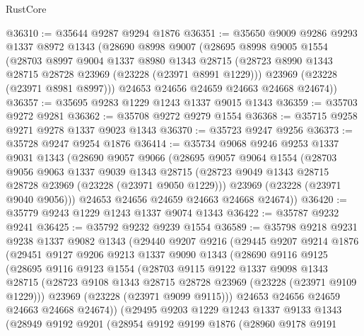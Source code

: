 \begin{lexlean}{RustCore}
\begin{coremodule}
@36310 := @35644 @9287 @9294 @1876
@36351 := @35650
    @9009
    @9286
    @9293
    @1337
    @8972
    @1343
    (@28690
      @8998
      @9007
      (@28695
        @8998
        @9005
        @1554
        (@28703
          @8997
          @9004
          @1337
          @8980
          @1343
          @28715
          (@28723 @8990 @1343 @28715 @28728 @23969 (@23228 (@23971 @8991 @1229)))
          @23969
          (@23228 (@23971 @8981 @8997)))
        @24653
        @24656
        @24659
        @24663
        @24668
        @24674))
@36357 := @35695 @9283 @1229 @1243 @1337 @9015 @1343
@36359 := @35703 @9272 @9281
@36362 := @35708 @9272 @9279 @1554
@36368 := @35715 @9258 @9271 @9278 @1337 @9023 @1343
@36370 := @35723 @9247 @9256
@36373 := @35728 @9247 @9254 @1876
@36414 := @35734
    @9068
    @9246
    @9253
    @1337
    @9031
    @1343
    (@28690
      @9057
      @9066
      (@28695
        @9057
        @9064
        @1554
        (@28703
          @9056
          @9063
          @1337
          @9039
          @1343
          @28715
          (@28723 @9049 @1343 @28715 @28728 @23969 (@23228 (@23971 @9050 @1229)))
          @23969
          (@23228 (@23971 @9040 @9056)))
        @24653
        @24656
        @24659
        @24663
        @24668
        @24674))
@36420 := @35779 @9243 @1229 @1243 @1337 @9074 @1343
@36422 := @35787 @9232 @9241
@36425 := @35792 @9232 @9239 @1554
@36589 := @35798
    @9218
    @9231
    @9238
    @1337
    @9082
    @1343
    (@29440
      @9207
      @9216
      (@29445
        @9207
        @9214
        @1876
        (@29451
          @9127
          @9206
          @9213
          @1337
          @9090
          @1343
          (@28690
            @9116
            @9125
            (@28695
              @9116
              @9123
              @1554
              (@28703
                @9115
                @9122
                @1337
                @9098
                @1343
                @28715
                (@28723 @9108 @1343 @28715 @28728 @23969 (@23228 (@23971 @9109 @1229)))
                @23969
                (@23228 (@23971 @9099 @9115)))
              @24653
              @24656
              @24659
              @24663
              @24668
              @24674))
          (@29495
            @9203
            @1229
            @1243
            @1337
            @9133
            @1343
            (@28949
              @9192
              @9201
              (@28954
                @9192
                @9199
                @1876
                (@28960
                  @9178
                  @9191

\end{coremodule}
\end{lexlean}
